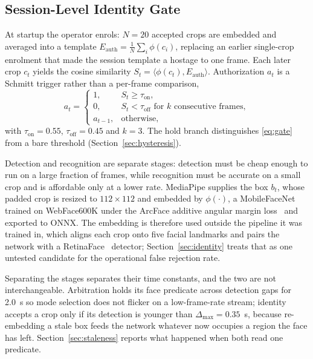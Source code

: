 \documentclass[conference]{IEEEtran}
\begin{document}
\subsection{Session-Level Identity Gate}
\label{sec:gate}

At startup the operator enrols: $N=20$ accepted crops are embedded and averaged
into a template $E_{\mathrm{auth}}=\tfrac{1}{N}\sum_{i}\phi(c_i)$, replacing an
earlier single-crop enrolment that made the session template a hostage to one
frame. Each later crop $c_t$ yields the cosine similarity
$S_t=\langle \phi(c_t),E_{\mathrm{auth}}\rangle$. Authorization $a_t$ is a
Schmitt trigger rather than a per-frame comparison,
\begin{equation}
a_t=
\begin{cases}
1, & S_t\ge\tau_{\mathrm{on}},\\
0, & S_t<\tau_{\mathrm{off}} \text{ for } k \text{ consecutive frames},\\
a_{t-1}, & \text{otherwise},
\end{cases}
\label{eq:gate}
\end{equation}
with $\tau_{\mathrm{on}}=0.55$, $\tau_{\mathrm{off}}=0.45$ and $k=3$. The hold
branch distinguishes \eqref{eq:gate} from a bare threshold
(Section~\ref{sec:hysteresis}).

Detection and recognition are separate stages: detection must be cheap enough to
run on a large fraction of frames, while recognition must be accurate on a small
crop and is affordable only at a lower rate. MediaPipe supplies the box $b_t$,
whose padded crop is resized to $112\times112$ and embedded by $\phi(\cdot)$, a
MobileFaceNet~\cite{chen2018mobilefacenets} trained on WebFace600K under the
ArcFace additive angular margin loss~\cite{deng2019} and exported to ONNX. The
embedding is therefore used outside the pipeline it was trained in, which aligns
each crop onto five facial landmarks and pairs the network with a
RetinaFace~\cite{deng2020retinaface} detector;
Section~\ref{sec:identity} treats that as one untested candidate for the
operational false rejection rate.

Separating the stages separates their time constants, and the two are not
interchangeable. Arbitration holds its face predicate across detection gaps for
2.0~s so mode selection does not flicker on a low-frame-rate stream; identity
accepts a crop only if its detection is younger than $\Delta_{\max}=0.35$~s,
because re-embedding a stale box feeds the network whatever now occupies a
region the face has left. Section~\ref{sec:staleness} reports what happened when
both read one predicate.
\end{document}
